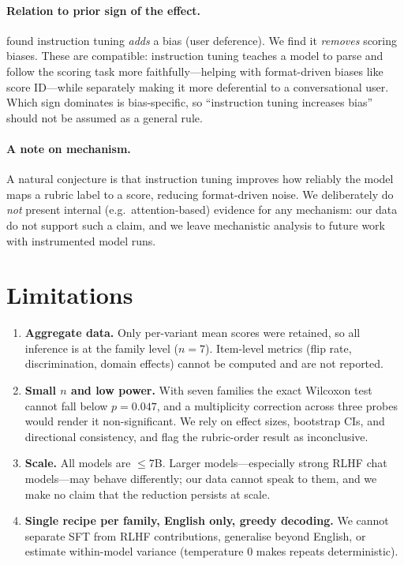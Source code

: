 \documentclass[11pt]{article}
\begin{document}
\paragraph{Relation to prior sign of the effect.} \citet{pan2025user} found
instruction tuning \emph{adds} a bias (user deference). We find it \emph{removes}
scoring biases. These are compatible: instruction tuning teaches a model to parse
and follow the scoring task more faithfully---helping with format-driven biases
like score ID---while separately making it more deferential to a conversational
user. Which sign dominates is bias-specific, so ``instruction tuning increases
bias'' should not be assumed as a general rule.

\paragraph{A note on mechanism.} A natural conjecture is that instruction tuning
improves how reliably the model maps a rubric label to a score, reducing
format-driven noise. We deliberately do \emph{not} present internal (e.g.\
attention-based) evidence for any mechanism: our data do not support such a claim,
and we leave mechanistic analysis to future work with instrumented model runs.

\section{Limitations}\label{sec:limits}
\begin{enumerate}\itemsep2pt
  \item \textbf{Aggregate data.} Only per-variant mean scores were retained, so
        all inference is at the family level ($n=7$). Item-level metrics (flip
        rate, discrimination, domain effects) cannot be computed and are not
        reported.
  \item \textbf{Small $n$ and low power.} With seven families the exact Wilcoxon
        test cannot fall below $p=0.047$, and a multiplicity correction across
        three probes would render it non-significant. We rely on effect sizes,
        bootstrap CIs, and directional consistency, and flag the rubric-order
        result as inconclusive.
  \item \textbf{Scale.} All models are $\leq$7B. Larger models---especially
        strong RLHF chat models---may behave differently; our data cannot speak
        to them, and we make no claim that the reduction persists at scale.
  \item \textbf{Single recipe per family, English only, greedy decoding.} We
        cannot separate SFT from RLHF contributions, generalise beyond English,
        or estimate within-model variance (temperature 0 makes repeats
        deterministic).
\end{enumerate}
\end{document}
